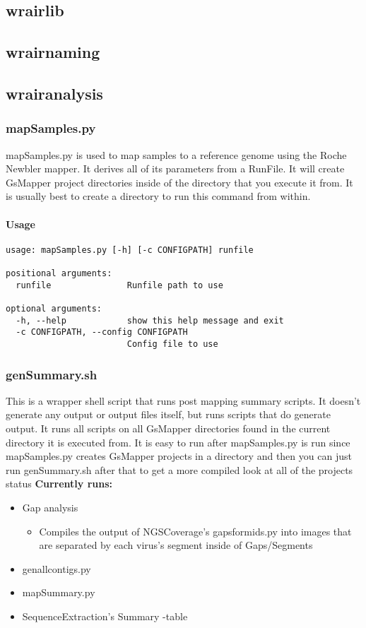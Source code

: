 \documentclass{article}
\begin{document}
\subsection{wrairlib}

\subsection{wrairnaming}

\subsection{wrairanalysis}

\subsubsection{mapSamples.py}
mapSamples.py is used to map samples to a reference genome using the Roche Newbler mapper.
It derives all of its parameters from a RunFile.
It will create GsMapper project directories inside of the directory that you execute it from. It is usually best to create a directory to run 
this command from within.

\paragraph{Usage}

\begin{lstlisting}
usage: mapSamples.py [-h] [-c CONFIGPATH] runfile

positional arguments:
  runfile               Runfile path to use

optional arguments:
  -h, --help            show this help message and exit
  -c CONFIGPATH, --config CONFIGPATH
                        Config file to use
\end{lstlisting}

\subsubsection{genSummary.sh}
This is a wrapper shell script that runs post mapping summary scripts. It doesn't generate any output or output files itself, but runs scripts that
do generate output.
It runs all scripts on all GsMapper directories found in the current directory it is executed from.
It is easy to run after mapSamples.py is run since mapSamples.py creates GsMapper projects in a directory and then you can just run genSummary.sh 
after that to get a more compiled look at all of the projects status
\textbf{Currently runs:}
\begin{itemize}
 \item Gap analysis
  \begin{itemize}
   \item Compiles the output of NGSCoverage's gapsformids.py into images that are separated by each virus's segment inside of Gaps/Segments
  \end{itemize}
 \item genallcontigs.py
 \item mapSummary.py 
 \item SequenceExtraction's Summary -table
\end{itemize}
\end{document}
